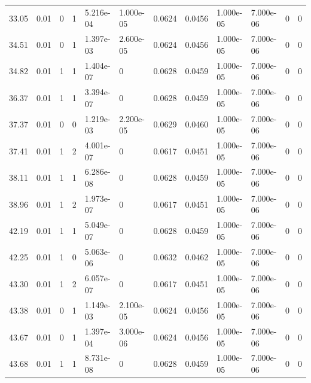 \documentclass[preview]{standalone}
\begin{document}
{{\begin{tabular}{L{1.2cm}C{1.2cm} C{0.3cm}C{0.5cm} C{1.4cm}C{1.4cm} C{1.4cm}C{1.4cm} C{1.6cm}C{1.6cm} C{1.6cm}C{1.6cm}}
  33.05  &  0.01  & 0     &  1 &  5.216e-04  & 1.000e-05  &  0.0624&   0.0456& 1.000e-05 & 7.000e-06   &  0 & 0  \\ 
  34.51  &  0.01  & 0     &  1 &  1.397e-03  & 2.600e-05  &  0.0624&   0.0456& 1.000e-05 & 7.000e-06   &  0 & 0  \\ 
  34.82  &  0.01  & 1     &  1 &  1.404e-07  & 0  &  0.0628&   0.0459& 1.000e-05 & 7.000e-06   &  0 & 0  \\ 
  36.37  &  0.01  & 1     &  1 &  3.394e-07  & 0  &  0.0628&   0.0459& 1.000e-05 & 7.000e-06   &  0 & 0  \\ 
  37.37  &  0.01  & 0     &  0 &  1.219e-03  & 2.200e-05  &  0.0629&   0.0460& 1.000e-05 & 7.000e-06   &  0 & 0  \\ 
  37.41  &  0.01  & 1     &  2 &  4.001e-07  & 0  &  0.0617&   0.0451& 1.000e-05 & 7.000e-06   &  0 & 0  \\ 
  38.11  &  0.01  & 1     &  1 &  6.286e-08  & 0  &  0.0628&   0.0459& 1.000e-05 & 7.000e-06   &  0 & 0  \\ 
  38.96  &  0.01  & 1     &  2 &  1.973e-07  & 0  &  0.0617&   0.0451& 1.000e-05 & 7.000e-06   &  0 & 0  \\ 
  42.19  &  0.01  & 1     &  1 &  5.049e-07  & 0  &  0.0628&   0.0459& 1.000e-05 & 7.000e-06   &  0 & 0  \\ 
  42.25  &  0.01  & 1     &  0 &  5.063e-06  & 0  &  0.0632&   0.0462& 1.000e-05 & 7.000e-06   &  0 & 0  \\ 
  43.30  &  0.01  & 1     &  2 &  6.057e-07  & 0  &  0.0617&   0.0451& 1.000e-05 & 7.000e-06   &  0 & 0  \\ 
  43.38  &  0.01  & 0     &  1 &  1.149e-03  & 2.100e-05  &  0.0624&   0.0456& 1.000e-05 & 7.000e-06   &  0 & 0  \\ 
  43.67  &  0.01  & 0     &  1 &  1.397e-04  & 3.000e-06  &  0.0624&   0.0456& 1.000e-05 & 7.000e-06   &  0 & 0  \\ 
  43.68  &  0.01  & 1     &  1 &  8.731e-08  & 0  &  0.0628&   0.0459& 1.000e-05 & 7.000e-06   &  0 & 0  \\ 
\hline 
\end{tabular} 

}}
\end{document}
